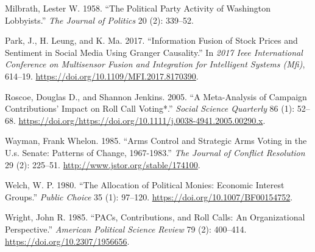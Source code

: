 \documentclass[12pt,]{article}
\begin{document}
\leavevmode\hypertarget{ref-milbrath1958}{}%
Milbrath, Lester W. 1958. ``The Political Party Activity of Washington
Lobbyists.'' \emph{The Journal of Politics} 20 (2): 339--52.

\leavevmode\hypertarget{ref-park2017}{}%
Park, J., H. Leung, and K. Ma. 2017. ``Information Fusion of Stock
Prices and Sentiment in Social Media Using Granger Causality.'' In
\emph{2017 Ieee International Conference on Multisensor Fusion and
Integration for Intelligent Systems (Mfi)}, 614--19.
\url{https://doi.org/10.1109/MFI.2017.8170390}.

\leavevmode\hypertarget{ref-roscoe2005}{}%
Roscoe, Douglas D., and Shannon Jenkins. 2005. ``A Meta-Analysis of
Campaign Contributions' Impact on Roll Call Voting*.'' \emph{Social
Science Quarterly} 86 (1): 52--68.
\url{https://doi.org/https://doi.org/10.1111/j.0038-4941.2005.00290.x}.

\leavevmode\hypertarget{ref-wayman1985}{}%
Wayman, Frank Whelon. 1985. ``Arms Control and Strategic Arms Voting in
the U.s. Senate: Patterns of Change, 1967-1983.'' \emph{The Journal of
Conflict Resolution} 29 (2): 225--51.
\url{http://www.jstor.org/stable/174100}.

\leavevmode\hypertarget{ref-welch1980}{}%
Welch, W. P. 1980. ``The Allocation of Political Monies: Economic
Interest Groups.'' \emph{Public Choice} 35 (1): 97--120.
\url{https://doi.org/10.1007/BF00154752}.

\leavevmode\hypertarget{ref-wright1985}{}%
Wright, John R. 1985. ``PACs, Contributions, and Roll Calls: An
Organizational Perspective.'' \emph{American Political Science Review}
79 (2): 400--414. \url{https://doi.org/10.2307/1956656}.





\newpage
\singlespacing 
\end{document}
